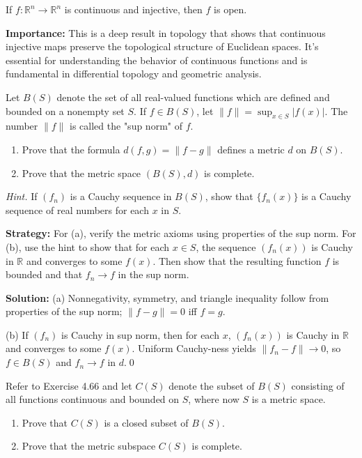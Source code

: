 \begin{theorem}
If $f: \mathbb{R}^n \to \mathbb{R}^n$ is continuous and injective, then $f$ is open.
\end{theorem}

\noindent\textbf{Importance:} This is a deep result in topology that shows that continuous injective maps preserve the topological structure of Euclidean spaces. It's essential for understanding the behavior of continuous functions and is fundamental in differential topology and geometric analysis.





\begin{problembox}
\begin{problemstatement}
Let $B(S)$ denote the set of all real-valued functions which are defined and bounded on a nonempty set $S$. If $f \in B(S)$, let $\|f\| = \sup_{x \in S} |f(x)|$. The number $\|f\|$ is called the "sup norm" of $f$.
\begin{enumerate}[label=(\alph*)]
\item Prove that the formula $d(f, g) = \|f - g\|$ defines a metric $d$ on $B(S)$.
\item Prove that the metric space $(B(S), d)$ is complete. 
\end{enumerate}
\textit{Hint.} If $(f_n)$ is a Cauchy sequence in $B(S)$, show that $\{f_n(x)\}$ is a Cauchy sequence of real numbers for each $x$ in $S$.
\end{problemstatement}
\end{problembox}

\noindent\textbf{Strategy:} For (a), verify the metric axioms using properties of the sup norm. For (b), use the hint to show that for each $x \in S$, the sequence $(f_n(x))$ is Cauchy in $\mathbb{R}$ and converges to some $f(x)$. Then show that the resulting function $f$ is bounded and that $f_n \to f$ in the sup norm.

\bigskip\noindent\textbf{Solution:}
(a) Nonnegativity, symmetry, and triangle inequality follow from properties of the sup norm; $\|f-g\|=0$ iff $f=g$.

(b) If $(f_n)$ is Cauchy in sup norm, then for each $x$, $(f_n(x))$ is Cauchy in $\mathbb{R}$ and converges to some $f(x)$. Uniform Cauchy-ness yields $\|f_n-f\|\to 0$, so $f\in B(S)$ and $f_n\to f$ in $d$.\qed



\begin{problembox}
\begin{problemstatement}
Refer to Exercise 4.66 and let $C(S)$ denote the subset of $B(S)$ consisting of all functions continuous and bounded on $S$, where now $S$ is a metric space.
\begin{enumerate}[label=(\alph*)]
\item Prove that $C(S)$ is a closed subset of $B(S)$.
\item Prove that the metric subspace $C(S)$ is complete.
\end{enumerate}
\end{problemstatement}
\end{problembox}

